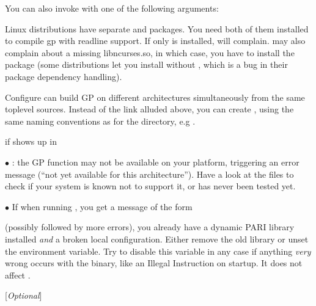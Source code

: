 You can also invoke  with one of the following arguments:




 Linux distributions have separate  and
 packages. You need both of them installed to compile gp
with readline support. If only  is installed, 
will complain.  may also complain about a missing
libncurses.so, in which case, you have to install the
 package (some distributions let you install
 without , which is a bug in their
package dependency handling).

 Configure can build GP on different architectures
simultaneously from the same toplevel sources. Instead of the 
link alluded above, you can create ,
using the same naming conventions as for the  directory,
e.g .


 if  shows up in 

$\bullet$ : the GP function  may not be available on
your platform, triggering an error message (``not yet available for this
architecture''). Have a look at the  files to check if your
system is known not to support it, or has never been tested yet.

$\bullet$ If when running , you get a message of the form


\noindent (possibly followed by more errors), you already have a dynamic PARI
library installed \emph{and} a broken local configuration. Either remove the
old library or unset the  environment variable. Try to
disable this variable in any case if anything \emph{very} wrong occurs with
the  binary, like an Illegal Instruction on startup. It does not
affect .

 [{\sl Optional\/}]

